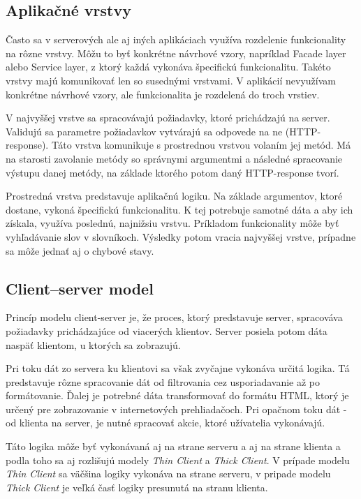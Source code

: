 \documentclass[
  digital, %
  table,   %
  lof,     %
  lot,     %
]{fithesis3}
\begin{document}
\subsection{Aplikačné vrstvy}
Často sa v serverových ale aj iných aplikáciach využíva rozdelenie funkcionality na rôzne vrstvy. Môžu to byť konkrétne návrhové vzory, napríklad Facade layer alebo Service layer, z ktorý každá vykonáva špecifickú funkcionalitu. Takéto vrstvy majú komunikovať len so susednými vrstvami. V aplikácií nevyužívam konkrétne návrhové vzory, ale funkcionalita je rozdelená do troch vrstiev.

V najvyššej vrstve sa spracovávajú požiadavky, ktoré prichádzajú na server. Validujú sa parametre požiadavkov vytvárajú sa odpovede na ne (HTTP-response). Táto vrstva komunikuje s prostrednou vrstvou volaním jej metód. Má na starosti zavolanie metódy so správnymi argumentmi a následné spracovanie výstupu danej metódy, na základe ktorého potom daný HTTP-response tvorí.

Prostredná vrstva predstavuje aplikačnú logiku. Na základe argumentov, ktoré dostane, vykoná špecifickú funkcionalitu. K tej potrebuje samotné dáta a aby ich získala, využíva poslednú, najnižsiu vrstvu. Príkladom funkcionality môže byť vyhľadávanie slov v slovníkoch. Výsledky potom vracia najvyššej vrstve, prípadne sa môže jednať aj o chybové stavy.

\subsection{Client–server model}
Princíp modelu client-server je, že proces, ktorý predstavuje server, spracováva požiadavky prichádzajúce od viacerých klientov. Server posiela potom dáta naspäť klientom, u ktorých sa zobrazujú.

Pri toku dát zo servera ku klientovi sa však zvyčajne vykonáva určitá logika. Tá predstavuje rôzne spracovanie dát od filtrovania cez usporiadavanie až po formátovanie. Ďalej je potrebné dáta transformovať do formátu HTML, ktorý je určený pre zobrazovanie v internetových prehliadačoch. Pri opačnom toku dát - od klienta na server, je nutné spracovať akcie, ktoré užívatelia vykonávajú.

Táto logika môže byť vykonávaná aj na strane serveru a aj na strane klienta a podla toho sa aj rozlišujú modely \textit{Thin Client} a \textit{Thick Client}. V prípade modelu \textit{Thin Client} sa väčšina logiky vykonáva na strane serveru, v pripade modelu \textit{Thick Client} je veľká časť logiky presunutá na stranu klienta.
\end{document}
